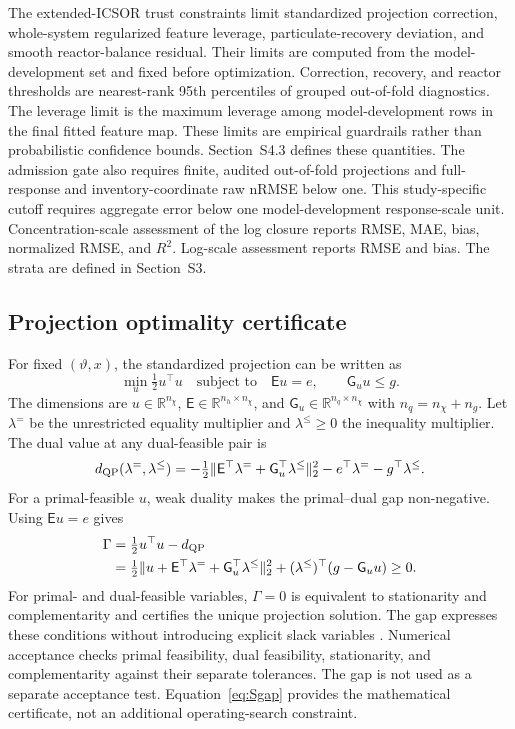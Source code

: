 \documentclass[a4paper,fleqn]{cas-sc}
\newcommand{\R}{\mathbb{R}}
\begin{document}
The extended-ICSOR trust constraints limit standardized projection correction, whole-system regularized feature leverage, particulate-recovery deviation, and smooth reactor-balance residual. Their limits are computed from the model-development set and fixed before optimization. Correction, recovery, and reactor thresholds are nearest-rank 95th percentiles of grouped out-of-fold diagnostics. The leverage limit is the maximum leverage among model-development rows in the final fitted feature map. These limits are empirical guardrails rather than probabilistic confidence bounds. Section~S4.3 defines these quantities. The admission gate also requires finite, audited out-of-fold projections and full-response and inventory-coordinate raw nRMSE below one. This study-specific cutoff requires aggregate error below one model-development response-scale unit. Concentration-scale assessment of the log closure reports RMSE, MAE, bias, normalized RMSE, and $R^2$. Log-scale assessment reports RMSE and bias. The strata are defined in Section~S3.

\subsection{Projection optimality certificate}
\label{sec:Scertificate}

For fixed $(\vartheta,x)$, the standardized projection can be written as
\begin{equation}
\min_u\tfrac12u^\top u\quad\text{subject to}\quad
\mathsf E u=e,\qquad \mathsf G_u u\le g.
\label{eq:Sstandardqp}
\end{equation}
The dimensions are $u\in\R^{n_\chi}$, $\mathsf E\in\R^{n_h\times n_\chi}$, and $\mathsf G_u\in\R^{n_q\times n_\chi}$ with $n_q=n_\chi+n_g$. Let $\lambda^{=}$ be the unrestricted equality multiplier and $\lambda^{\le}\ge0$ the inequality multiplier. The dual value at any dual-feasible pair is
\begin{equation}
d_{\rm QP}(\lambda^{=},\lambda^{\le})=
-\tfrac12\|\mathsf E^\top\lambda^{=}+\mathsf G_u^\top\lambda^{\le}\|_2^2
-e^\top\lambda^{=}-g^\top\lambda^{\le}.
\label{eq:Sdualqp}
\end{equation}
For a primal-feasible $u$, weak duality makes the primal--dual gap non-negative. Using $\mathsf Eu=e$ gives
\begin{align}
\Gamma={}&\tfrac12u^\top u-d_{\rm QP}\notag\\
={}&\tfrac12\|u+\mathsf E^\top\lambda^{=}+\mathsf G_u^\top\lambda^{\le}\|_2^2
+(\lambda^{\le})^\top(g-\mathsf G_u u)\ge0.
\label{eq:Sgap}
\end{align}
For primal- and dual-feasible variables, $\Gamma=0$ is equivalent to stationarity and complementarity and certifies the unique projection solution. The gap expresses these conditions without introducing explicit slack variables \citep{Boyd2004}. Numerical acceptance checks primal feasibility, dual feasibility, stationarity, and complementarity against their separate tolerances. The gap is not used as a separate acceptance test. Equation~\eqref{eq:Sgap} provides the mathematical certificate, not an additional operating-search constraint.
\end{document}
